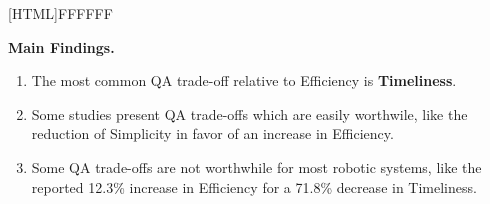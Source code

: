 \vspace{5mm}

\noindent{}[HTML]{FFFFFF}{\parbox{0.47\textwidth}{%
\noindent \textbf{Main Findings.}
\begin{enumerate}[nolistsep]
\item The most common QA trade-off relative to Efficiency is \textbf{Timeliness}.
\item Some studies present QA trade-offs which are easily worthwile, like the reduction of Simplicity in favor of an increase in Efficiency.
\item Some QA trade-offs are not worthwhile for most robotic systems, like the reported 12.3\% increase in Efficiency for a 71.8\% decrease in Timeliness.
\end{enumerate}}}

